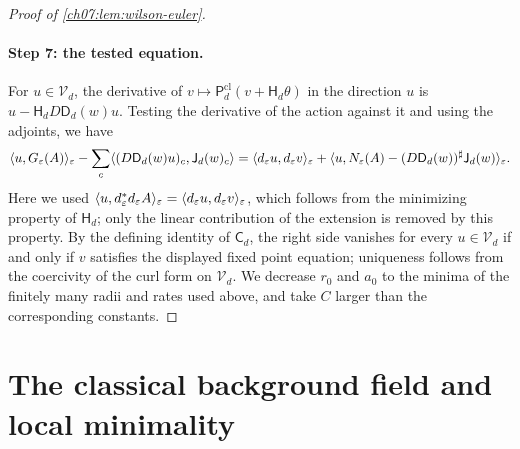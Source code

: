 \begin{proof}[Proof of \cref{ch07:lem:wilson-euler}]
\paragraph{Step 7: the tested equation.}
For $u\in\mathcal V_d$, the derivative of $v\mapsto\mathsf P_d^{\mathrm{cl}}(v+\mathsf H_d\theta)$ in the direction $u$ is $u-\mathsf H_dD\mathsf D_d(w)u$. Testing the derivative of the action against it and using the adjoints, we have
\[
 \langle u,G_\varepsilon(A)\rangle_\varepsilon-\sum_c\langle (D\mathsf D_d(w)u)_c,\mathsf J_d(w)_c\rangle
 =\langle d_\varepsilon u,d_\varepsilon v\rangle_\varepsilon
 +\langle u,N_\varepsilon(A)-(D\mathsf D_d(w))^\sharp\mathsf J_d(w)\rangle_\varepsilon .
\]
Here we used $\langle u,d_\varepsilon^*d_\varepsilon A\rangle_\varepsilon=\langle d_\varepsilon u,d_\varepsilon v\rangle_\varepsilon$, which follows from the minimizing property of $\mathsf H_d$; only the linear contribution of the extension is removed by this property. By the defining identity of $\mathsf C_d$, the right side vanishes for every $u\in\mathcal V_d$ if and only if $v$ satisfies the displayed fixed point equation; uniqueness follows from the coercivity of the curl form on $\mathcal V_d$. We decrease $r_0$ and $a_0$ to the minima of the finitely many radii and rates used above, and take $C$ larger than the corresponding constants.
\end{proof}

\section{The classical background field and local minimality}\label{ch07:sec:background}

